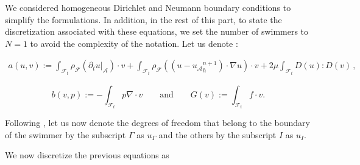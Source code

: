 \documentclass[graybox]{svmult}
\newcommand{\Fluid}{\mathcal{F}} %
\newcommand{\Alemap}{\mathcal{A}} %
\newcommand{\Vel}{u} %
\newcommand{\Pres}{p} %
\newcommand{\tvel}{U} %
\newcommand{\angvel}{\omega} %
\newcommand{\Solid}{\mathcal{S}} %
\newcommand{\normal}{n} %
\newcommand{\CompDomain}{\Fluid}
\begin{document}


We considered homogeneous Dirichlet and Neumann boundary conditions to simplify the formulations. In addition,
in the rest of this part, to state the discretization associated with these equations, we set the number of swimmers to $N=1$ to avoid the complexity of the notation.
Let us denote : 

\begin{eqnarray*}
a(u,v) := \int_{\CompDomain_{t}} \rho_\Fluid(\partial_t u|_\Alemap ) \cdot v + \int_{\CompDomain_{t}}\rho_\Fluid ((u -{u_{\mathcal{A}}}_h^{n+1} )\cdot \nabla u) \cdot v + 2\mu\int_{\CompDomain_{t}} D(u)	: D(v) \,, 
\end{eqnarray*}

$$
b(v,p) :=  -\int_{\CompDomain_{t}} p \nabla\cdot v \qquad \text{and} \qquad G(v) := \int_{{\CompDomain_{t}} } f \cdot v . 
$$
\color{black}

Following \cite{maury}, let us now denote the degrees of freedom that belong to the boundary of the swimmer by the subscript $\Gamma$ as $\Vel_\Gamma$ and the others by the subscript $I$ as $\Vel_I$.

\color{blue}
We now discretize the previous equations as %
\end{document}
